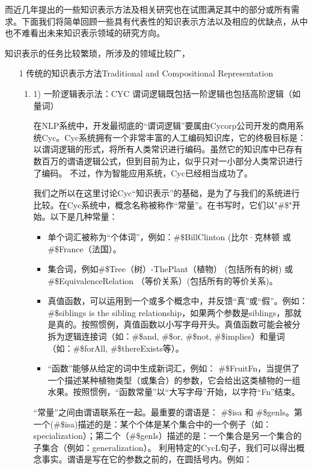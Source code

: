 而近几年提出的一些知识表示方法及相关研究也在试图满足其中的部分或所有需求。下面我们将简单回顾一些具有代表性的知识表示方法以及相应的优缺点，从中也不难看出未来知识表示领域的研究方向。

知识表示的任务比较繁琐，所涉及的领域比较广，

\begin{enumerate}
\item[1]  {传统的知识表示方法Traditional and Compositional Representation}

\begin{enumerate}
\item1) 一阶逻辑表示法：CYC
谓词逻辑既包括一阶逻辑也包括高阶逻辑（如量词）

在NLP系统中，开发最彻底的“谓词逻辑”要属由Cycorp公司开发的商用系统Cyc\cite{Lenat1990}。Cyc系统拥有一个非常丰富的人工编码知识库，它的终极目标是：以谓词逻辑的形式，将所有人类常识进行编码。虽然它的知识库中已存有数百万的谓语逻辑公式，但到目前为止，似乎只对一小部分人类常识进行了编码。 不过，作为智能应用系统，Cyc已经相当成功了。

我们之所以在这里讨论Cyc“知识表示”的基础，是为了与我们的系统进行比较。在Cyc系统中，概念名称被称作“常量”。在书写时，它们以"\#\$"开始。以下是几种常量：

\begin{itemize}
\item 单个词汇被称为“个体词”，例如：\#\$BillClinton (比尔·克林顿 或 \#\$France（法国）。
\item 集合词，例如\#\$Tree（树）-ThePlant（植物） (包括所有的树) 或 \#\$EquivalenceRelation （等价关系）(包括所有的等价关系)。
\item 真值函数，可以运用到一个或多个概念中，并反馈“真”或“假”。例如：\#\$siblings is the sibling relationship，如果两个参数是siblings，那就是真的。按照惯例，真值函数以小写字母开头。真值函数可能会被分拆为逻辑连接词（如：\#\$and, \#\$or, \#\$not, \#\$implies）和量词（如：\#\$forAll, \#\$thereExists等）。
\item “函数”能够从给定的词中生成新词汇，例如：
\#\$FruitFn，当提供了一个描述某种植物类型（或集合）的参数，它会给出这类植物的一组水果。按照惯例，“函数常量”以“大写字母”开始，以字符“Fn”结束。
\end{itemize}

“常量”之间由谓语联系在一起。最重要的谓语是： \#\$isa 和 \#\$genls。第一个(\#\$isa)描述的是：某个个体是某个集合中的一个例子（如：specialization）；第二个（\#\$genls）描述的是：一个集合是另一个集合的子集合（例如：generalization）。
利用特定的CycL句子，我们可以得出概念事实。谓语是写在它的参数之前的，在圆括号内。例如：


\end{enumerate}
\end{enumerate}
